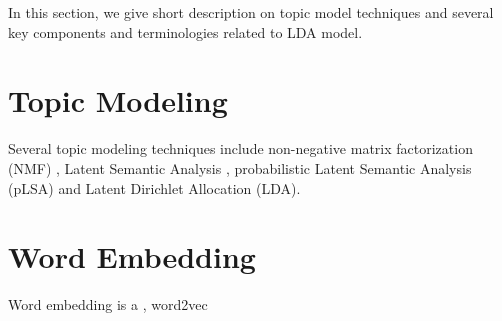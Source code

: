 In this section, we give short description on topic model techniques and several key components and terminologies related to LDA model.
\section{Topic Modeling} Several topic modeling techniques include non-negative matrix factorization (NMF) \cite{lee_learning_1999}, Latent Semantic Analysis \cite{landauer_solution_1997}, probabilistic Latent Semantic Analysis (pLSA) \cite{hofmann_probabilistic_2013} and Latent Dirichlet Allocation (LDA)\cite{blei_latent_2003}.

\section{Word Embedding}
Word embedding is a \cite{bengio_neural_nodate}, word2vec \cite{mikolov_distributed_nodate}
